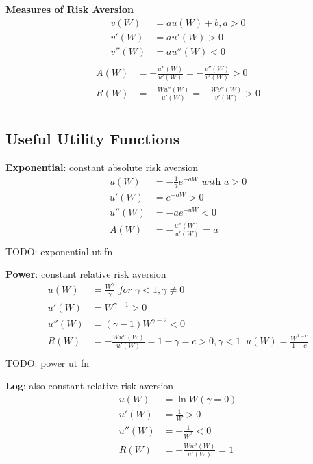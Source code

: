 \documentclass[
14pt,notheorems,hyperref={pdfauthor=whatever}
]{beamer}
\begin{document}
\begin{frame}
\textbf{Measures of Risk Aversion}\\
\hfill \break
\begin{align*}
    v(W)&=au(W)+b, a>0\\
    v'(W)&=au'(W)>0\\
    v''(W)&=au''(W)<0\\
\end{align*}
\begin{align*}
    A(W)&=-\frac{u''(W)}{u'(W)}=-\frac{v''(W)}{v'(W)}>0\\
    R(W)&=-\frac{Wu''(W)}{u'(W)}=-\frac{Wv''(W)}{v'(W)}>0\\
\end{align*}
\end{frame}

\subsection{Useful Utility Functions}
\begin{frame}
\textbf{Exponential}: constant absolute risk aversion\\
\begin{align*}
    u(W)&=-\frac{1}{a}e^{-aW} \textit{ with } a>0\\
    u'(W)&=e^{-aW}>0\\
    u''(W)&=-ae^{-aW}<0\\
    A(W)&=-\frac{u''(W)}{u'(W)} = a\\
\end{align*}
TODO: exponential ut fn
\end{frame}

\begin{frame}
\textbf{Power}: constant relative risk aversion\\
\begin{align*}
    u(W)&=\frac{W^\gamma}{\gamma} \textit{ for } \gamma<1, \gamma\neq0\\
    u'(W)&=W^{\gamma-1}>0\\
    u''(W)&=(\gamma-1)W^{\gamma-2}<0\\
    R(W)&=-\frac{Wu''(W)}{u'(W)} = 1-\gamma = c > 0, \gamma < 1 \;\; u(W)=\frac{W^{1-c}}{1-c}\\
\end{align*}
TODO: power ut fn
\end{frame}

\begin{frame}
\textbf{Log}: also constant relative risk aversion\\
\begin{align*}
    u(W)&=\ln{W} (\gamma=0)\\
    u'(W)&=\frac{1}{W}>0\\
    u''(W)&=-\frac{1}{W^2}<0\\
    R(W)&=-\frac{Wu''(W)}{u'(W)}=1\\
\end{align*}
\end{frame}
\end{document}
